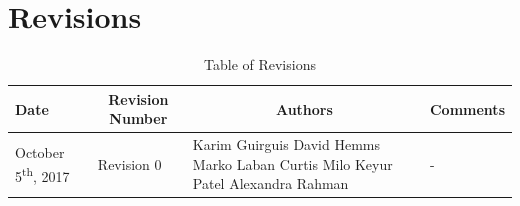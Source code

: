 \documentclass [10pt]{article}
\begin{document}

\pagebreak


\tableofcontents
\listoftables

\pagebreak


\section{Revisions}
\begin{longtable}{| p{ } | p{ } | p{ } | p{ } |}\caption{Table of Revisions}  \\

\hline 
\centering \textbf{Date} & 
\multicolumn{1}{c}{\textbf {Revision Number}} &
\multicolumn{1}{|c}{\textbf {Authors}} & 
\multicolumn{1}{|c|}{\textbf {Comments}} \\ \hline

\multirow{4}{*}{\centering October 5\textsuperscript{th}, 2017}  & 
\multirow{4}{*}{Revision 0}& 
		{Karim Guirguis \newline
		David Hemms \newline
		Marko Laban \newline
		Curtis Milo \newline
		Keyur Patel \newline
		Alexandra Rahman}
 &
 
\multirow{4}{*}{-} \\ 
\hline 

\end{longtable}



\pagebreak

\end{document}
